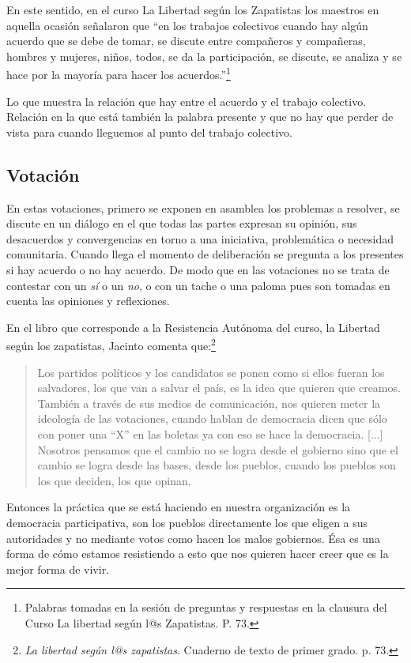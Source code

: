 \documentclass[oneside]{book}
\begin{document}
En este sentido, en el curso La Libertad según los Zapatistas los maestros en aquella ocasión señalaron que “en los trabajos colectivos cuando hay algún acuerdo que se debe de tomar, se discute entre compañeros y compañeras, hombres y mujeres, niños, todos, se da la participación, se discute, se analiza y se hace por la mayoría para hacer los acuerdos.”\footnote{Palabras tomadas en la sesión de preguntas y respuestas en la clausura del Curso La libertad según l@s Zapatistas. P. 73.}

Lo que muestra la relación que hay entre el acuerdo y el trabajo colectivo. Relación en la que está también la palabra presente y que no hay que perder de vista para cuando lleguemos al punto del trabajo colectivo.

\subsection{Votación}

En estas votaciones, primero se exponen en asamblea los problemas a resolver, se discute en un diálogo en el que todas las partes expresan su opinión, sus desacuerdos y convergencias en torno a una iniciativa, problemática o necesidad comunitaria. Cuando llega el momento de deliberación se pregunta a los presentes si hay acuerdo o no hay acuerdo. De modo que en las votaciones no se trata de contestar con un \textit{sí} o un \textit{no}, o con un tache o una paloma pues son tomadas en cuenta las opiniones y reflexiones.

En el libro que corresponde a la Resistencia Autónoma del curso, la Libertad según los zapatistas, Jacinto comenta que:\footnote{\textit{La libertad según l@s zapatistas}. Cuaderno de texto de primer grado. p. 73.}
\begin{quote}
Los partidos políticos y los candidatos se ponen como si ellos fueran los salvadores, los que van a salvar el país, es la idea que quieren que creamos. También a través de sus medios de comunicación, nos quieren meter la ideología de las votaciones, cuando hablan de democracia dicen que sólo con poner una “X” en las boletas ya con eso se hace la democracia.
[...]
Nosotros pensamos que el cambio no se logra desde el gobierno sino que el cambio se logra desde las bases, desde los pueblos, cuando los pueblos son los que deciden, los que opinan.
\end{quote}
Entonces la práctica que se está haciendo en nuestra organización es la democracia participativa, son los pueblos directamente los que eligen a sus autoridades y no mediante votos como hacen los malos gobiernos. Ésa es una forma de cómo estamos resistiendo a esto que nos quieren hacer creer que es la mejor forma de vivir. 
\end{document}
